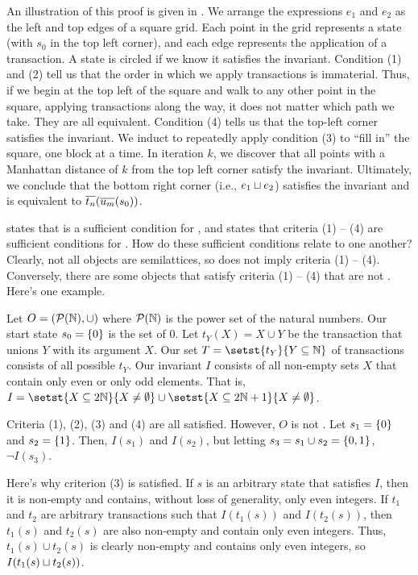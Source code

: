 {}

An illustration of this proof is given in . We
arrange the expressions $e_1$ and $e_2$ as the left and top edges of a square
grid. Each point in the grid represents a state (with $s_0$ in the top left
corner), and each edge represents the application of a transaction. A state is
circled if we know it satisfies the invariant.
%
Condition (1) and (2) tell us that the order in which we apply transactions is
immaterial. Thus, if we begin at the top left of the square and walk to any
other point in the square, applying transactions along the way, it does not
matter which path we take. They are all equivalent. Condition (4) tells us that
the top-left corner satisfies the invariant. We induct to repeatedly apply
condition (3) to ``fill in'' the square, one block at a time. In iteration $k$,
we discover that all points with a Manhattan distance of $k$ from the top left
corner satisfy the invariant. Ultimately, we conclude that the bottom right
corner (i.e., $e_1 \sqcup e_2$) satisfies the invariant and is equivalent to
$\overline{t_{n}}(\overline{u_{m}}(s_0))$.

 states that \invariantclosure{} is a
sufficient condition for \invariantconfluence{}, and 
states that criteria (1) -- (4) are sufficient conditions for
\invariantconfluence{}. How do these sufficient conditions relate to one
another?  Clearly, not all \invariantclosed{} objects are semilattices, so
\invariantclosure{} does not imply criteria (1) -- (4). Conversely, there are
some objects that satisfy criteria (1) -- (4) that are not
\invariantclosed{}. Here's one example.

\begin{example}
  Let $O = (\mathcal{P}(\mathbb{N}), \cup)$ where $\mathcal{P}(\mathbb{N})$ is the power
  set of the natural numbers. Our start state $s_0 = \{0\}$ is the set of
  $0$. Let $t_Y(X) = X \cup Y$ be the transaction that unions $Y$ with its
  argument $X$. Our set $T = \setst{t_Y}{Y \subseteq \nats}$ of transactions
  consists of all possible $t_Y$. Our invariant $I$ consists of all non-empty
  sets $X$ that contain only even or only odd elements. That is, $I = \setst{X
  \subseteq 2\nats}{X \neq \emptyset} \cup \setst{X \subseteq 2\nats + 1}{X
  \neq \emptyset}$.

  Criteria (1), (2), (3) and (4) are all satisfied. However, $O$ is not
  \Iclosed{}. Let $s_1 = \{0\}$ and $s_2 = \{1\}$. Then, $I(s_1)$ and
  $I(s_2)$, but letting $s_3 = s_1 \cup s_2 = \{0, 1\}$, $\lnot I(s_3)$.

  Here's why criterion (3) is satisfied. If $s$ is an arbitrary state that
  satisfies $I$, then it is non-empty and contains, without loss of generality,
  only even integers. If $t_1$ and $t_2$ are arbitrary transactions such that
  $I(t_1(s))$ and $I(t_2(s))$, then $t_1(s)$ and $t_2(s)$ are also non-empty
  and contain only even integers. Thus, $t_1(s) \cup t_2(s)$ is clearly
  non-empty and contains only even integers, so $I(t_1(s) \sqcup t_2(s))$.
\end{example}

